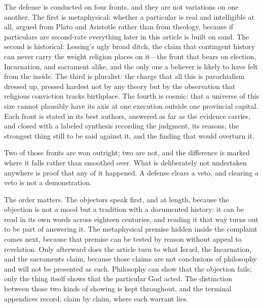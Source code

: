 The defense is conducted on four fronts, and they are not variations on one another. The first is metaphysical: whether a particular is real and intelligible at all, argued from Plato and Aristotle rather than from theology, because if particulars are second-rate everything later in this article is built on sand. The second is historical: Lessing's ugly broad ditch, the claim that contingent history can never carry the weight religion places on it---the front that bears on election, Incarnation, and sacrament alike, and the only one a believer is likely to have felt from the inside. The third is pluralist: the charge that all this is parochialism dressed up, pressed hardest not by any theory but by the observation that religious conviction tracks birthplace. The fourth is cosmic: that a universe of this size cannot plausibly have its axis at one execution outside one provincial capital. Each front is stated in its best authors, answered as far as the evidence carries, and closed with a labeled synthesis recording the judgment, its reasons, the strongest thing still to be said against it, and the finding that would overturn it.

Two of those fronts are won outright; two are not, and the difference is marked where it falls rather than smoothed over. What is deliberately not undertaken anywhere is proof that any of it happened. A defense clears a veto, and clearing a veto is not a demonstration.

The order matters. The objectors speak first, and at length, because the objection is not a mood but a tradition with a documented history: it can be read in its own words across eighteen centuries, and reading it that way turns out to be part of answering it. The metaphysical premise hidden inside the complaint comes next, because that premise can be tested by reason without appeal to revelation. Only afterward does the article turn to what Israel, the Incarnation, and the sacraments claim, because those claims are not conclusions of philosophy and will not be presented as such. Philosophy can show that the objection fails; only the thing itself shows that the particular God acted. The distinction between those two kinds of showing is kept throughout, and the terminal appendices record, claim by claim, where each warrant lies.
